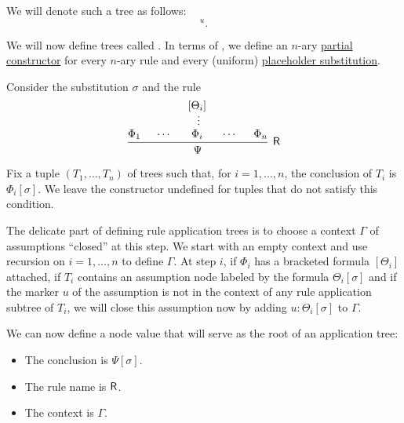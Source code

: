 \begin{definition}
\begin{thmenum}[resume=def:natural_deduction_proof_tree]
    We will denote such a tree as follows:
    \begin{equation*}
      [\varphi]^u.
    \end{equation*}

     We will now define trees called . In terms of , we define an \( n \)-ary \hyperref[thm:least_fixed_point_recursion/base]{partial constructor} for every \( n \)-ary rule and every (uniform) \hyperref[def:uniform_placeholder_substitution]{placeholder substitution}.

    Consider the substitution \( \sigma \) and the rule
    \begin{equation*}
      \begin{prooftree}
        \hypo{ \Phi_1 }
        \hypo{ \cdots }
        \hypo{ [\Theta_i] }
        \ellipsis {} { \Phi_i }
        \hypo{ \cdots }
        \hypo{ \Phi_n }
        \infer5[\logic{R}]{ \Psi }
      \end{prooftree}
    \end{equation*}

    Fix a tuple \( (T_1, \ldots, T_n) \) of trees such that, for \( i = 1, \ldots, n \), the conclusion of \( T_i \) is \( \Phi_i[\sigma] \). We leave the constructor undefined for tuples that do not satisfy this condition.

    The delicate part of defining rule application trees is to choose a context \( \Gamma \) of assumptions \enquote{closed} at this step. We start with an empty context and use recursion on \( i = 1, \ldots, n \) to define \( \Gamma \). At step \( i \), if \( \Phi_i \) has a bracketed formula \( [\Theta_i] \) attached, if \( T_i \) contains an assumption node labeled by the formula \( \Theta_i[\sigma] \) and if the marker \( u \) of the assumption is not in the context of any rule application subtree of \( T_i \), we will close this assumption now by adding \( u: \Theta_i[\sigma] \) to \( \Gamma \).

    We can now define a node value that will serve as the root of an application tree:
    \begin{itemize}
      \item The conclusion is \( \Psi[\sigma] \).
      \item The rule name is \( \textsf{R} \).
      \item The context is \( \Gamma \).
    \end{itemize}


\end{thmenum}
\end{definition}
